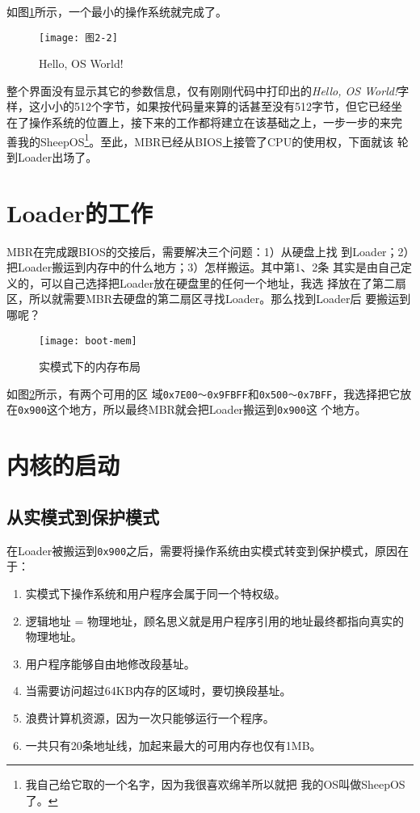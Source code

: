 如图\ref{fig:img2-2}所示，一个最小的操作系统就完成了。

\begin{figure}[H]
  \centering
  \texttt{[image: 图2-2]}
  \caption{Hello, OS World!}
  \label{fig:img2-2}
\end{figure}

整个界面没有显示其它的参数信息，仅有刚刚代码中打印出的\emph{Hello, OS World!}字
样，这小小的512个字节，如果按代码量来算的话甚至没有512字节，但它已经坐
在了操作系统的位置上，接下来的工作都将建立在该基础之上，一步一步的来完
善我的SheepOS\footnote{我自己给它取的一个名字，因为我很喜欢绵羊所以就把
  我的OS叫做SheepOS了。}。至此，MBR已经从BIOS上接管了CPU的使用权，下面就该
轮到Loader出场了。

\section{Loader的工作}
\label{sec:Loader}

MBR在完成跟BIOS的交接后，需要解决三个问题：1）从硬盘上找
到Loader；2）把Loader搬运到内存中的什么地方；3）怎样搬运。其中第1、2条
其实是由自己定义的，可以自己选择把Loader放在硬盘里的任何一个地址，我选
择放在了第二扇区，所以就需要MBR去硬盘的第二扇区寻找Loader。那么找到Loader后
要搬运到哪呢？

\begin{figure}
  \centering
  \texttt{[image: boot-mem]}
  \caption{实模式下的内存布局}
  \label{fig:neicun}
\end{figure}

如图\ref{fig:neicun}所示，有两个可用的区
域\texttt{0x7E00～0x9FBFF}和\texttt{0x500～0x7BFF}，我选择把它放
在\texttt{0x900}这个地方，所以最终MBR就会把Loader搬运到\texttt{0x900}这
个地方。

\section{内核的启动}
\label{sec:kernel}

\subsection{从实模式到保护模式}
\label{subsec:protect}

在Loader被搬运到\texttt{0x900}之后，需要将操作系统由实模式转变到保护模式\cite{LWY2013}，原因在于：
\begin{enumerate}
\item 实模式下操作系统和用户程序会属于同一个特权级。
\item 逻辑地址 = 物理地址，顾名思义就是用户程序引用的地址最终都指向真实的物理地址。
\item 用户程序能够自由地修改段基址。
\item 当需要访问超过64KB内存的区域时，要切换段基址。
\item 浪费计算机资源，因为一次只能够运行一个程序。
\item 一共只有20条地址线，加起来最大的可用内存也仅有1MB。
\end{enumerate}

